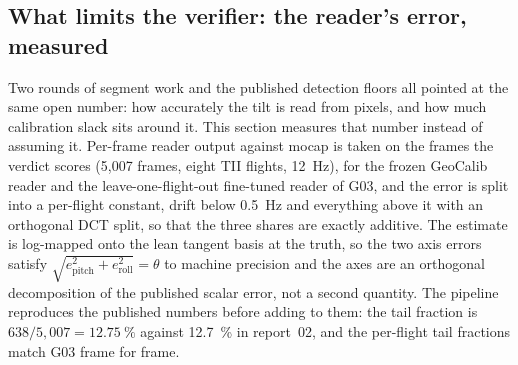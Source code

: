 
\subsection{What limits the verifier: the reader's error, measured}
\label{sec:j-reader-error}

Two rounds of segment work and the published detection floors all pointed at the same open number:
how accurately the tilt is read from pixels, and how much calibration slack sits around it. This
section measures that number instead of assuming it. Per-frame reader output against mocap is
taken on the frames the verdict scores (5{,}007 frames, eight TII flights, \SI{12}{Hz}), for the
frozen GeoCalib reader and the leave-one-flight-out fine-tuned reader of G03, and the error is
split into a per-flight constant, drift below \SI{0.5}{Hz} and everything above it with an
orthogonal DCT split, so that the three shares are exactly additive. The estimate is log-mapped
onto the lean tangent basis at the truth, so the two axis errors satisfy
$\sqrt{e_{\mathrm{pitch}}^2+e_{\mathrm{roll}}^2}=\theta$ to machine precision and the axes are an
orthogonal decomposition of the published scalar error, not a second quantity. The pipeline
reproduces the published numbers before adding to them: the tail fraction is
$638/5{,}007=\SI{12.75}{\percent}$ against \SI{12.7}{\percent} in report~02, and the per-flight
tail fractions match G03 frame for frame.

